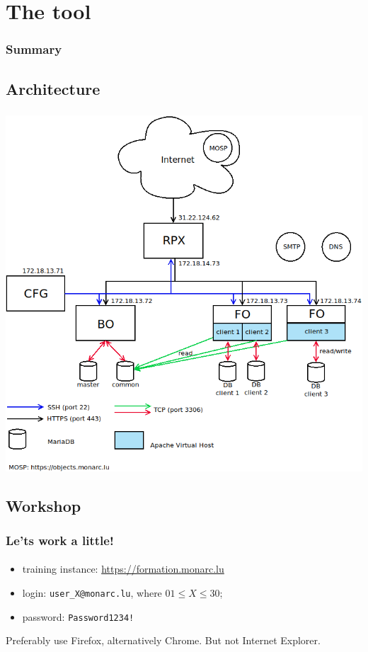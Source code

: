 %
%
\section{The tool}
\begin{frame}
    \frametitle{Summary}
\end{frame}
\subsection{Architecture}
\begin{frame}
    \frametitle{}
    \framesubtitle{}
    \begin{center}
        \includegraphics[scale=0.3]{../common_pictures/monarc-architecture.png}
    \end{center}
\end{frame}



\subsection{Workshop}
\begin{frame}
    \frametitle{Le'ts work a little!}
    \framesubtitle{}
    \begin{itemize}
      \item training instance: \url{https://formation.monarc.lu}
      \item login: \texttt{user\_X@monarc.lu}, where $01 \leq X \leq 30$;
      \item password: \texttt{Password1234!}
    \end{itemize}

    \bigskip
    Preferably use Firefox, alternatively Chrome. But not Internet Explorer.
\end{frame}



